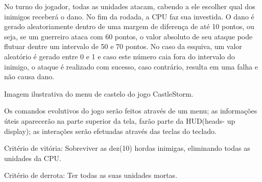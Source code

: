 \par
 \-No turno do jogador, todas as unidades atacam, cabendo a ele escolher qual dos inimigos receberá o dano. \-No fim da rodada, a \-C\-P\-U faz sua investida. \-O dano é gerado aleatoriamente dentro de uma margem de diferença de até 10 pontos, ou seja, se um guerreiro ataca com 60 pontos, o valor absoluto de seu ataque pode flutuar dentre um intervalo de 50 e 70 pontos. \-No caso da esquiva, um valor aleatório é gerado entre 0 e 1 e caso este número caia fora do intervalo do inimigo, o ataque é realizado com sucesso, caso contrário, resulta em uma falha e não causa dano.\par
  \-Imagem ilustrativa do menu de castelo do jogo \-Castle\-Storm.\par
\par
 \-Os comandos evolutivos do jogo serão feitos através de um menu; as informações úteis aparecerão na parte superior da tela, farão parte da \-H\-U\-D(heads-\/ up display); as interações serão efetuadas através das teclas do teclado.\par
 \-Critério de vitória\-: \-Sobreviver as dez(10) hordas inimigas, eliminando todas as unidades da \-C\-P\-U.\par
 \-Critério de derrota\-: \-Ter todas as suas unidades mortas.\par
\par
\par
 